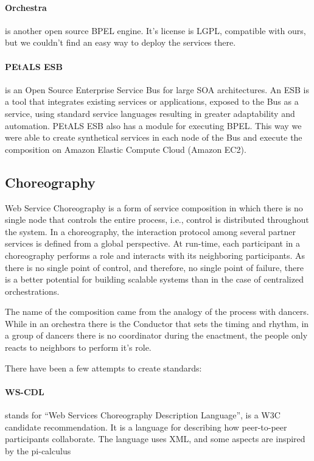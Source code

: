 \paragraph{Orchestra}
is another open source BPEL engine. It's license is LGPL, compatible with ours, but we couldn't find an easy way to deploy the services there.

\paragraph{PEtALS ESB}
is an Open Source Enterprise Service Bus for large SOA architectures. \citep{PEtALS} An ESB is a tool that integrates existing services or applications, exposed to the Bus as a service, using standard service languages resulting in greater adaptability and automation. PEtALS ESB also has a module for executing BPEL. This way we were able to create synthetical services in each node of the Bus and execute the composition on Amazon Elastic Compute Cloud (Amazon EC2).



\subsection{Choreography}
Web Service Choreography is a form of service composition in which there is no single node that controls the entire process, i.e., control is distributed throughout the system. In a choreography, the interaction protocol among several partner services is defined from a global perspective. At run-time, each participant in a choreography performs a role and interacts with its neighboring participants. As there is no single point of control, and therefore, no single point of failure, there is a better potential for building scalable systems than in the case of centralized orchestrations.

The name of the composition came from the analogy of the process with dancers. While in an orchestra there is the Conductor that sets the timing and rhythm, in a group of dancers there is no coordinator during the enactment, the people only reacts to neighbors to perform it's role.

There have been a few attempts to create standards:

\paragraph{WS-CDL}
stands for ``Web Services Choreography Description Language'', is a W3C candidate recommendation. It is a language for describing how peer-to-peer participants collaborate. The language uses XML, and some aspects are inspired by the pi-calculus

